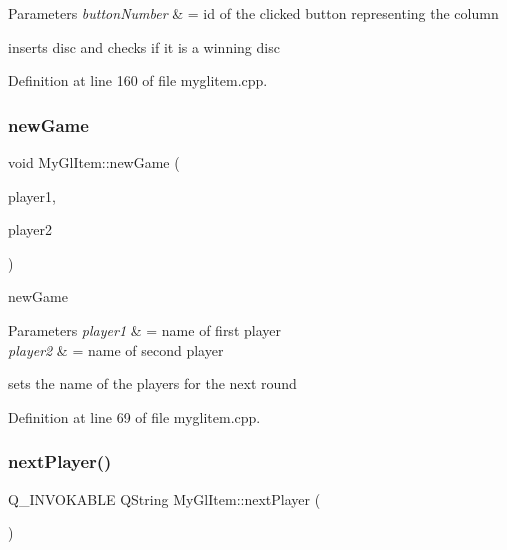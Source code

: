 \begin{DoxyParams}{Parameters}
{\em button\+Number} & = id of the clicked button representing the column\\
\hline
\end{DoxyParams}
inserts disc and checks if it is a winning disc 

Definition at line 160 of file myglitem.\+cpp.

\mbox{\label{class_my_gl_item_ad6a0178cad3d36add83687a4f95ca668}} 
\subsubsection{\texorpdfstring{newGame}{newGame}}
{\footnotesize\ttfamily void My\+Gl\+Item\+::new\+Game (\begin{DoxyParamCaption}\item[{Q\+String}]{player1,  }\item[{Q\+String}]{player2 }\end{DoxyParamCaption})\hspace{0.3cm}{\ttfamily [slot]}}



new\+Game 


\begin{DoxyParams}{Parameters}
{\em player1} & = name of first player \\
\hline
{\em player2} & = name of second player\\
\hline
\end{DoxyParams}
sets the name of the players for the next round 

Definition at line 69 of file myglitem.\+cpp.

\mbox{\label{class_my_gl_item_a52e7f492f9ddbbd17868c059282ca397}} 
\subsubsection{\texorpdfstring{nextPlayer()}{nextPlayer()}}
{\footnotesize\ttfamily Q\+\_\+\+I\+N\+V\+O\+K\+A\+B\+LE Q\+String My\+Gl\+Item\+::next\+Player (\begin{DoxyParamCaption}{ }\end{DoxyParamCaption})\hspace{0.3cm}{\ttfamily [inline]}}

